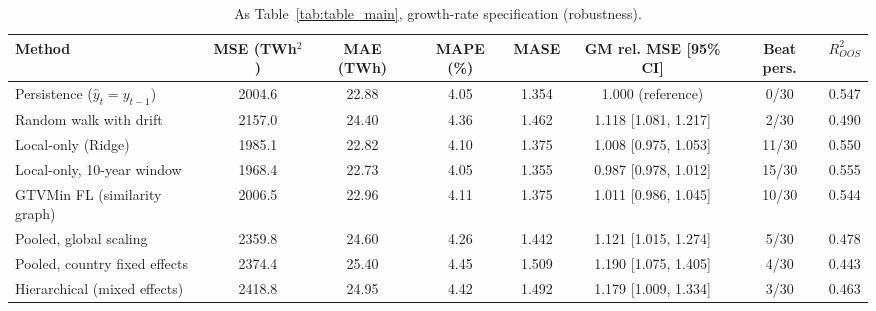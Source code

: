 \begin{table}[htbp]
\centering
\caption{As Table~\ref{tab:table_main}, growth-rate specification (robustness).}
\label{tab:table_main_growth}
\begin{tabular}{lccccccc}
\toprule
Method & MSE (TWh$^2$) & MAE (TWh) & MAPE (\%) & MASE & GM rel. MSE [95\% CI] & Beat pers. & $R^2_{OOS}$ \\
\midrule
Persistence ($\hat y_t = y_{t-1}$) & 2004.6 & 22.88 & 4.05 & 1.354 & 1.000 (reference) & 0/30 & 0.547 \\
Random walk with drift & 2157.0 & 24.40 & 4.36 & 1.462 & 1.118 [1.081, 1.217] & 2/30 & 0.490 \\
Local-only (Ridge) & 1985.1 & 22.82 & 4.10 & 1.375 & 1.008 [0.975, 1.053] & 11/30 & 0.550 \\
Local-only, 10-year window & 1968.4 & 22.73 & 4.05 & 1.355 & 0.987 [0.978, 1.012] & 15/30 & 0.555 \\
GTVMin FL (similarity graph) & 2006.5 & 22.96 & 4.11 & 1.375 & 1.011 [0.986, 1.045] & 10/30 & 0.544 \\
Pooled, global scaling & 2359.8 & 24.60 & 4.26 & 1.442 & 1.121 [1.015, 1.274] & 5/30 & 0.478 \\
Pooled, country fixed effects & 2374.4 & 25.40 & 4.45 & 1.509 & 1.190 [1.075, 1.405] & 4/30 & 0.443 \\
Hierarchical (mixed effects) & 2418.8 & 24.95 & 4.42 & 1.492 & 1.179 [1.009, 1.334] & 3/30 & 0.463 \\
\bottomrule
\end{tabular}
\end{table}
